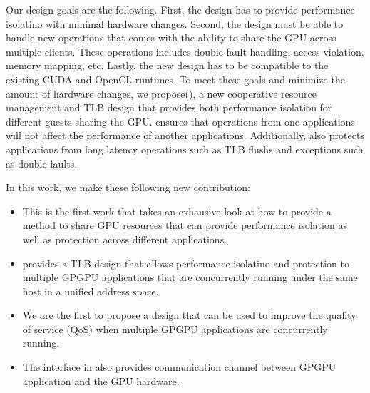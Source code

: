 Our design goals are the following. First, the design has to provide
performance isolatino with minimal hardware changes. Second, the design must be
able to handle new operations that comes with the ability to share the GPU
across multiple clients. These operations includes double fault handling,
access violation, memory mapping, etc. Lastly, the new design has to be
compatible to the existing CUDA and OpenCL runtimes. To meet these goals and
minimize the amount of hardware changes, we propose\titleLong (\titleShort), a
new cooperative resource management and  TLB design that provides both
performance isolation for different guests sharing the GPU.  \titleShort
ensures that operations from one applications will not affect the performance
of another applications.  Additionally, \titleShort also protects applications
from long latency operations such as TLB flushs and exceptions such as double
faults.

In this work, we make these following new contribution:
\begin{itemize}

\item This is the first work that takes an exhausive look at how to provide a
method to share GPU resources that can provide performance isolation as well as
protection across different applications.

\item \titleShort provides a TLB design that allows performance isolatino and
protection to multiple GPGPU applications that are concurrently running under
the same host in a unified address space.

\item We are the first to propose a design that can be used to improve the
quality of service (QoS) when multiple GPGPU applications are concurrently
running.

\item The interface in \titleShort also provides communication channel between
GPGPU application and the GPU hardware.

\end{itemize}




